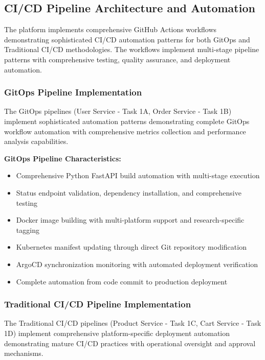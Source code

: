 \subsection{CI/CD Pipeline Architecture and Automation}

The platform implements comprehensive GitHub Actions workflows demonstrating sophisticated CI/CD automation patterns for both GitOps and Traditional CI/CD methodologies. The workflows implement multi-stage pipeline patterns with comprehensive testing, quality assurance, and deployment automation.

\subsubsection{GitOps Pipeline Implementation}

The GitOps pipelines (User Service - Task 1A, Order Service - Task 1B) implement sophisticated automation patterns demonstrating complete GitOps workflow automation with comprehensive metrics collection and performance analysis capabilities.

\textbf{GitOps Pipeline Characteristics:}
\begin{itemize}
\item Comprehensive Python FastAPI build automation with multi-stage execution
\item Status endpoint validation, dependency installation, and comprehensive testing
\item Docker image building with multi-platform support and research-specific tagging
\item Kubernetes manifest updating through direct Git repository modification
\item ArgoCD synchronization monitoring with automated deployment verification
\item Complete automation from code commit to production deployment
\end{itemize}

\subsubsection{Traditional CI/CD Pipeline Implementation}

The Traditional CI/CD pipelines (Product Service - Task 1C, Cart Service - Task 1D) implement comprehensive platform-specific deployment automation demonstrating mature CI/CD practices with operational oversight and approval mechanisms.

